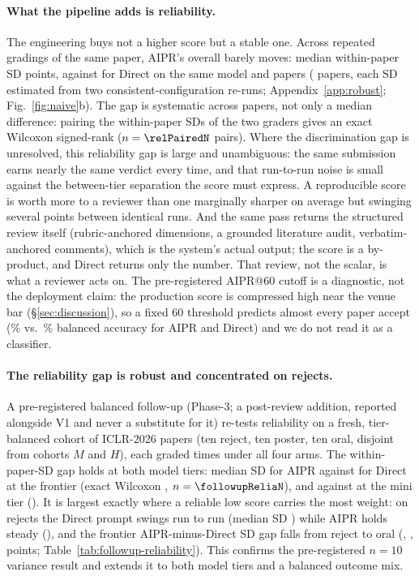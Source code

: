 \paragraph{What the pipeline adds is reliability.}
The engineering buys not a higher score but a stable one. Across repeated gradings of the
same paper, AIPR's overall barely moves: median within-paper SD \fullRunSD{} points,
against \naiveRunSD{} for Direct on the same model and papers (\runSDnPapers{} papers,
each SD estimated from two consistent-configuration re-runs; Appendix~\ref{app:robust};
Fig.~\ref{fig:naive}b). The gap is systematic across papers, not only a median
difference: pairing the within-paper SDs of the two graders gives an exact Wilcoxon
signed-rank \relPairedP{} ($n=\relPairedN$ pairs). Where the discrimination gap is unresolved, this reliability gap
is large and unambiguous: the same submission earns nearly the same verdict every time,
and that run-to-run noise is small against the between-tier separation the score must
express. A reproducible score is worth more to a reviewer than one marginally sharper on
average but swinging several points between identical runs. And the same pass returns the
structured review itself (rubric-anchored dimensions, a grounded literature audit,
verbatim-anchored comments), which is the system's actual output; the score is a
by-product, and Direct returns only the number. That review, not the scalar, is what a
reviewer acts on. The pre-registered AIPR@60 cutoff is a diagnostic, not the deployment claim: the
production score is compressed high near the venue bar (\S\ref{sec:discussion}), so a
fixed 60 threshold predicts almost every paper accept (\opSixtyFullAcc\% vs.\
\opSixtyNaiveAcc\% balanced accuracy for AIPR and Direct) and we do not read it as a
classifier.

\paragraph{The reliability gap is robust and concentrated on rejects.}
A pre-registered balanced follow-up (Phase-3; a post-review addition, reported alongside V1
and never a substitute for it) re-tests reliability on a fresh, tier-balanced cohort of
\followupReliaN{} ICLR-2026 papers (ten reject, ten poster, ten oral, disjoint from cohorts
$M$ and $H$), each graded \followupReliaRuns{} times under all four arms. The within-paper-SD
gap holds at both model tiers: median SD \followupFrontAiprSD{} for AIPR against
\followupFrontDirectSD{} for Direct at the frontier (exact Wilcoxon \followupFrontReliaPrel,
$n=\followupReliaN$), and \followupMiniAiprSD{} against \followupMiniDirectSD{} at the mini
tier (\followupMiniReliaPrel). It is largest exactly where a reliable low score carries the
most weight: on rejects the Direct prompt swings run to run (median SD \followupRejectDirectSD{})
while AIPR holds steady (\followupRejectAiprSD{}), and the frontier AIPR-minus-Direct SD gap
falls from reject to oral (\followupRejectDelta{}, \followupPosterDelta{}, \followupOralDelta{}
points; Table~\ref{tab:followup-reliability}). This confirms the pre-registered $n=10$ variance
result and extends it to both model tiers and a balanced outcome mix.

